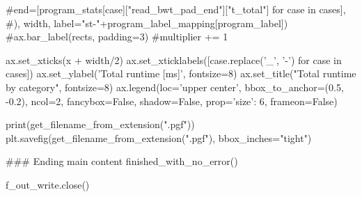     #end=[program_stats[case]["read_bwt_pad_end"]["t_total"] for case in cases],
    #), width, label="st-"+program_label_mapping[program_label])
    #ax.bar_label(rects, padding=3)
    #multiplier += 1

ax.set_xticks(x + width/2)
ax.set_xticklabels([case.replace('_', '-') for case in cases])
ax.set_ylabel('Total runtime [ms]', fontsize=8)
ax.set_title("Total runtime by category", fontsize=8)
ax.legend(loc='upper center', bbox_to_anchor=(0.5, -0.2),
    ncol=2, fancybox=False, shadow=False, prop={'size': 6}, frameon=False)

print(get_filename_from_extension(".pgf"))
plt.savefig(get_filename_from_extension(".pgf"), bbox_inches="tight")




### Ending main content
finished_with_no_error()


f_out_write.close()




